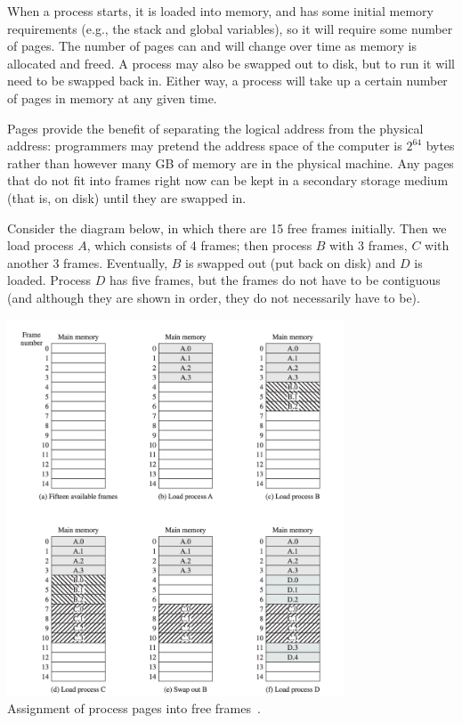 When a process starts, it is loaded into memory, and has some initial memory requirements (e.g., the stack and global variables), so it will require some number of pages. The number of pages can and will change over time as memory is allocated and freed. A process may also be swapped out to disk, but to run it will need to be swapped back in. Either way, a process will take up a certain number of pages in memory at any given time.

Pages provide the benefit of separating the logical address from the physical address: programmers may pretend the address space of the computer is $2^{64}$ bytes rather than however many GB of memory are in the physical machine. Any pages that do not fit into frames right now can be kept in a secondary storage medium (that is, on disk) until they are swapped in. 

Consider the diagram below, in which there are 15 free frames initially. Then we load process $A$, which consists of 4 frames; then process $B$ with 3 frames, $C$ with another 3 frames. Eventually, $B$ is swapped out (put back on disk) and $D$ is loaded. Process $D$ has five frames, but the frames do not have to be contiguous (and although they are shown in order, they do not necessarily have to be).

\begin{center}
\includegraphics[width=0.75\textwidth]{images/loading-pages.png}\\
Assignment of process pages into free frames~\cite{osi}.
\end{center}

